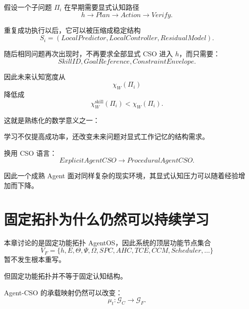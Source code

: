 假设一个子问题 $\Pi_i$ 在早期需要显式认知路径
\begin{equation}
h
\rightarrow
Plan
\rightarrow
Action
\rightarrow
Verify.
\end{equation}

重复成功执行以后，它可以被压缩成稳定结构
\begin{equation}
S_i
=
(LocalPredictor,LocalController,ResidualModel).
\end{equation}

随后相同问题再次出现时，不再要求全部显式 CSO 进入 $h$，而只需要：
\begin{equation}
SkillID,
GoalReference,
ConstraintEnvelope.
\end{equation}

因此未来认知宽度从
\begin{equation}
\chi_W(\Pi_i)
\end{equation}
降低成
\begin{equation}
\chi_W^{\mathrm{skill}}(\Pi_i)
<
\chi_W(\Pi_i).
\end{equation}

这就是熟练化的数学意义之一：

\begin{statementbox}
学习不仅提高成功率，还改变未来问题对显式工作记忆的结构需求。
\end{statementbox}

换用 CSO 语言：
\begin{equation}
ExplicitAgentCSO
\rightarrow
ProceduralAgentCSO.
\end{equation}

因此一个成熟 Agent 面对同样复杂的现实环境，其显式认知压力可以随着经验增加而下降。

\section{固定拓扑为什么仍然可以持续学习}

本章讨论的是固定功能拓扑 AgentOS，因此系统的顶层功能节点集合
\begin{equation}
V_F
=
\{
h,E,\Theta,\Psi,\Omega,
SPC,AHC,TCE,CCM,Scheduler,\ldots
\}
\end{equation}
暂不发生根本重写。

但固定功能拓扑并不等于固定认知结构。

Agent-CSO 的承载映射仍然可以改变：
\begin{equation}
\mu_t:
\mathcal G_C
\rightarrow
\mathcal G_F.
\end{equation}

